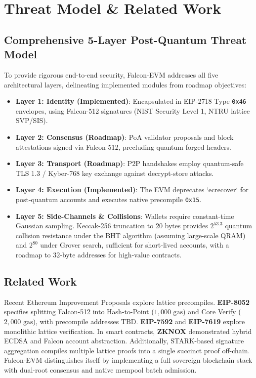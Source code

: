 \documentclass[a4paper,fleqn]{cas-dc}
\begin{document}
\section{Threat Model \& Related Work}
\label{sec:threat_model}

\subsection{Comprehensive 5-Layer Post-Quantum Threat Model}
To provide rigorous end-to-end security, Falcon-EVM addresses all five architectural layers, delineating implemented modules from roadmap objectives:
\begin{itemize}
    \setlength{\itemsep}{0.5pt}
    \setlength{\parskip}{0pt}
    \item \textbf{Layer 1: Identity (Implemented)}: Encapsulated in EIP-2718 Type \texttt{0x46} envelopes, using Falcon-512 signatures (NIST Security Level 1, NTRU lattice SVP/SIS).
    \item \textbf{Layer 2: Consensus (Roadmap)}: PoA validator proposals and block attestations signed via Falcon-512, precluding quantum forged headers.
    \item \textbf{Layer 3: Transport (Roadmap)}: P2P handshakes employ quantum-safe TLS 1.3 / Kyber-768 key exchange against decrypt-store attacks.
    \item \textbf{Layer 4: Execution (Implemented)}: The EVM deprecates `ecrecover` for post-quantum accounts and executes native precompile \texttt{0x15}.
    \item \textbf{Layer 5: Side-Channels \& Collisions}: Wallets require constant-time Gaussian sampling. Keccak-256 truncation to 20 bytes provides $2^{53.3}$ quantum collision resistance under the BHT algorithm \citep{brassard1998quantum} (assuming large-scale QRAM) and $2^{80}$ under Grover search, sufficient for short-lived accounts, with a roadmap to 32-byte addresses for high-value contracts.
\end{itemize}

\subsection{Related Work}
Recent Ethereum Improvement Proposals explore lattice precompiles. \textbf{EIP-8052} \citep{dubois2025eip8052} specifies splitting Falcon-512 into Hash-to-Point ($1,000\text{ gas}$) and Core Verify ($2,000\text{ gas}$), with precompile addresses TBD. \textbf{EIP-7592} \citep{eip7592} and \textbf{EIP-7619} \citep{eip7619} explore monolithic lattice verification. In smart contracts, \textbf{ZKNOX} \citep{zknox2024} demonstrated hybrid ECDSA and Falcon account abstraction. Additionally, STARK-based signature aggregation \citep{bensasson2018stark} compiles multiple lattice proofs into a single succinct proof off-chain. Falcon-EVM distinguishes itself by implementing a full sovereign blockchain stack with dual-root consensus and native mempool batch admission.
\end{document}

